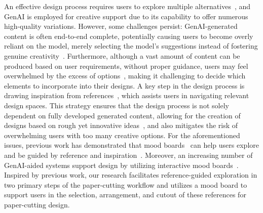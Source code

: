 An effective design process requires users to explore multiple alternatives~\cite{Jansson:1991:designfixation, Goldschmidt:2011:avoidingfixation}, and GenAI is employed for creative support due to its capability to offer numerous high-quality variations. However, some challenges persist: GenAI-generated content is often end-to-end complete, potentially causing users to become overly reliant on the model, merely selecting the model's suggestions instead of fostering genuine creativity~\cite{Tohidi:designreight}. Furthermore, although a vast amount of content can be produced based on user requirements, without proper guidance, users may feel overwhelmed by the excess of options~\cite{Suh:2024:luminate}, making it challenging to decide which elements to incorporate into their designs. A key step in the design process is drawing inspiration from references~\cite{Shneiderman:2000:creating, Eckert:2000:sources}, which assists users in navigating relevant design spaces. This strategy ensures that the design process is not solely dependent on fully developed generated content, allowing for the creation of designs based on rough yet innovative ideas~\cite{Tohidi:designreight, Choi:2024:creativeconnect}, and also mitigates the risk of overwhelming users with too many creative options. 
For the aforementioned issues, previous work has demonstrated that mood boards~\cite{Cassidy:2008:moodboards} can help users explore and be guided by reference and inspiration~\cite{Eckert:2000:sources, Garner:2001:problem}. Moreover, an increasing number of GenAI-aided systems support design by utilizing interactive mood boards~\cite{Choi:2024:creativeconnect, Wan:2023:gancollage, Peng:2024:designprompt}. Inspired by previous work, our research facilitates reference-guided exploration in two primary steps of the paper-cutting workflow and utilizes a mood board to support users in the selection, arrangement, and cutout of these references for paper-cutting design.